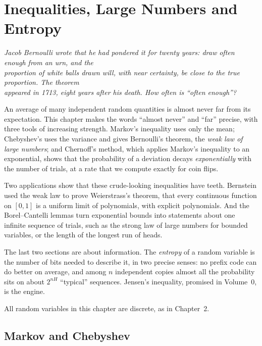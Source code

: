 \chapter{Inequalities, Large Numbers and Entropy}

\begin{center}\itshape
Jacob Bernoulli wrote that he had pondered it for twenty years: draw often enough from an urn, and the\\
proportion of white balls drawn will, with near certainty, be close to the true proportion. The theorem\\
appeared in 1713, eight years after his death. How often is ``often enough''?
\end{center}

An average of many independent random quantities is almost never far from its expectation. This chapter makes
the words ``almost never'' and ``far'' precise, with three tools of increasing strength. Markov's inequality uses only the
mean; Chebyshev's uses the variance and gives Bernoulli's theorem, the \emph{weak law of large numbers}; and
Chernoff's method, which applies Markov's inequality to an exponential, shows that the probability of a deviation
decays \emph{exponentially} with the number of trials, at a rate that we compute exactly for coin flips.

Two applications show that these crude-looking inequalities have teeth. Bernstein used the weak law to prove
Weierstrass's theorem, that every continuous function on $[0,1]$ is a uniform limit of polynomials, with explicit
polynomials. And the Borel--Cantelli lemmas turn exponential bounds into statements about one infinite sequence of
trials, such as the strong law of large numbers for bounded variables, or the length of the longest run of heads.

The last two sections are about information. The \emph{entropy} of a random variable is the number of bits needed
to describe it, in two precise senses: no prefix code can do better on average, and among $n$ independent copies
almost all the probability sits on about $2^{nH}$ ``typical'' sequences. Jensen's inequality, promised in Volume~0,
is the engine.

All random variables in this chapter are discrete, as in Chapter~2.

\section{Markov and Chebyshev}

